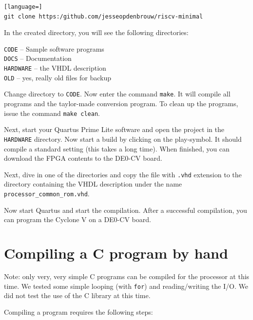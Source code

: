 \documentclass[12pt]{article}
\begin{document}
\begin{lstlisting}[language=]
git clone https:/github.com/jesseopdenbrouw/riscv-minimal
\end{lstlisting}

In the created directory, you will see the following directories:

\texttt{CODE} -- Sample software programs\\
\texttt{DOCS} -- Documentation\\
\texttt{HARDWARE} -- the VHDL description \\
\texttt{OLD} -- yes, really old files for backup

Change directory to \texttt{CODE}. Now enter the command \texttt{make}. It will compile all programs and the taylor-made conversion program. To clean up the programs, issue the command \texttt{make clean}.

Next, start your Quartus Prime Lite software and open the project in the \texttt{HARDWARE} directory. Now start a build by clicking on the play-symbol. It should compile a standard setting (this takes a long time). When finished, you can download the FPGA contents to the DE0-CV board.

Next, dive in one of the directories and copy the file with \texttt{.vhd} extension to the directory containing the VHDL description under the name \texttt{processor\_common\_rom.vhd}.

Now start Quartus and start the compilation. After a successful compilation, you can program the Cyclone V on a DE0-CV board.

\section{Compiling a C program by hand}
Note: only very, very simple C programs can be compiled for the processor at this time. We tested some simple looping (with \texttt{for}) and reading/writing the I/O. We did not test the use of the C library at this time.

Compiling a program requires the following steps:
\end{document}

